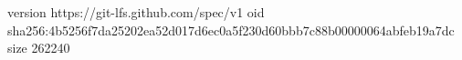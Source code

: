version https://git-lfs.github.com/spec/v1
oid sha256:4b5256f7da25202ea52d017d6ec0a5f230d60bbb7c88b00000064abfeb19a7dc
size 262240

